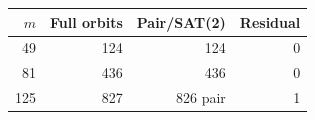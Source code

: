 \begin{tabular}{rrrr}\toprule $m$ & Full orbits & Pair/SAT(2) & Residual \\
\midrule
49 & 124 & 124 & 0 \\
81 & 436 & 436 & 0 \\
125 & 827 & 826 pair & 1 \\
\bottomrule\end{tabular}
